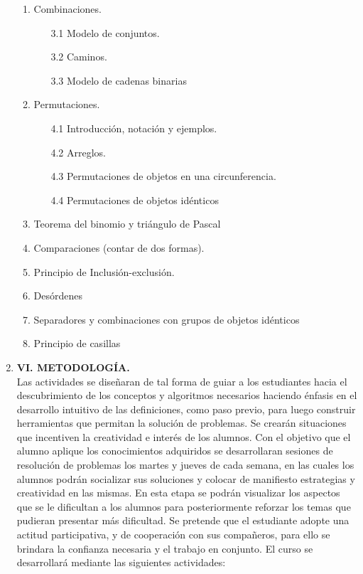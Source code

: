 \begin{enumerate}
\begin{enumerate}
   
   \item Combinaciones.
   \begin{enumerate}
       \item [3.1] Modelo de conjuntos.
       \item [3.2] Caminos.
       \item [3.3] Modelo de cadenas binarias
   \end{enumerate}

    \item Permutaciones.
   \begin{enumerate}
       \item [4.1] Introducci\'on, notaci\'on y ejemplos.
       \item [4.2] Arreglos.
       \item [4.3] Permutaciones de objetos en una circunferencia.
       \item [4.4] Permutaciones de objetos id\'enticos
       
   \end{enumerate}
  
   \item Teorema del binomio y tri\'angulo de Pascal

   \item Comparaciones (contar de dos formas).
   \item Principio de Inclusión-exclusión. 
   \item Desórdenes
\item Separadores y combinaciones con grupos de objetos idénticos
\item  Principio de casillas
   
    
  
\end{enumerate}





\item {\bf \large VI. METODOLOG\'IA.}\\

Las actividades se diseñaran de tal forma de guiar a los estudiantes hacia el descubrimiento de los conceptos y algoritmos necesarios haciendo énfasis en el desarrollo intuitivo de las definiciones, como paso previo, para luego construir herramientas que permitan la solución de problemas. Se crearán situaciones que incentiven la creatividad e interés de los alumnos. Con el objetivo que el
alumno aplique los conocimientos adquiridos se desarrollaran sesiones de resolución de problemas los martes y jueves de cada semana, en las cuales los alumnos podrán socializar sus soluciones y colocar de manifiesto estrategias y creatividad en las mismas. En esta etapa se podrán visualizar los aspectos que se le dificultan a los alumnos para posteriormente reforzar los temas que pudieran
presentar más dificultad. Se pretende que el estudiante adopte una actitud participativa, y de cooperación con sus compañeros, para ello se brindara la confianza necesaria y el trabajo en conjunto. El curso se desarrollará mediante las siguientes actividades:


\end{enumerate}
